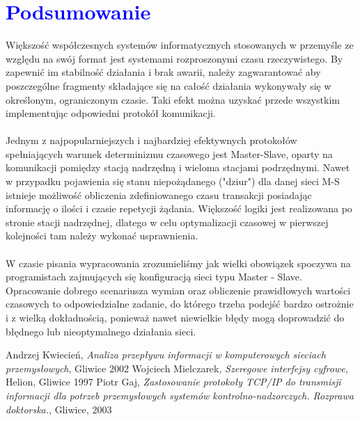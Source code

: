 \documentclass[a4paper,twoside]{article}
\begin{document}
\section{\textcolor{blue}{Podsumowanie}}
Większość współczesnych systemów informatycznych stosowanych w przemyśle ze względu na swój format jest systemami rozproszonymi czasu rzeczywistego. By zapewnić im stabilność działania i brak awarii, należy zagwarantować aby poszczególne fragmenty składające się na całość działania wykonywały się w określonym, ograniczonym czasie. Taki efekt można uzyskać przede wszystkim implementując odpowiedni protokół komunikacji. \\\\
Jednym z najpopularniejszych i najbardziej efektywnych protokołów spełniających warunek determinizmu czasowego jest Master-Slave, oparty na komunikacji pomiędzy stacją nadrzędną i wieloma stacjami podrzędnymi. Nawet w przypadku pojawienia się stanu niepożądanego ("dziur") dla danej sieci M-S istnieje możliwość obliczenia zdefiniowanego czasu transakcji posiadając informację o ilości i czasie repetycji żądania. Większość logiki jest realizowana po stronie stacji nadrzędnej, dlatego w celu optymalizacji czasowej w pierwszej kolejności tam należy wykonać usprawnienia.\\\\
W czasie pisania wypracowania zrozumieliśmy jak wielki obowiązek spoczywa na programistach zajmujących się konfiguracją sieci typu Master - Slave. Opracowanie dobrego scenariusza wymian oraz obliczenie prawidłowych wartości czasowych to odpowiedzialne zadanie, do którego trzeba podejść bardzo ostrożnie i z wielką dokładnością, ponieważ nawet niewielkie błędy mogą doprowadzić do błędnego lub nieoptymalnego działania sieci.


\vfill
\begin{thebibliography}{2}
	 Andrzej Kwiecień, \textit{Analiza przepływu informacji w komputerowych sieciach przemysłowych}, Gliwice 2002
	 Wojciech Mielczarek, \textit{Szeregowe interfejsy cyfrowe}, Helion, Gliwice 1997
	 Piotr Gaj, \textit{Zastosowanie protokoły TCP/IP do transmisji informacji dla potrzeb przemysłowych systemów kontrolno-nadzorczych. Rozprawa doktorska.}, Gliwice, 2003
\end{thebibliography}
\end{document}

